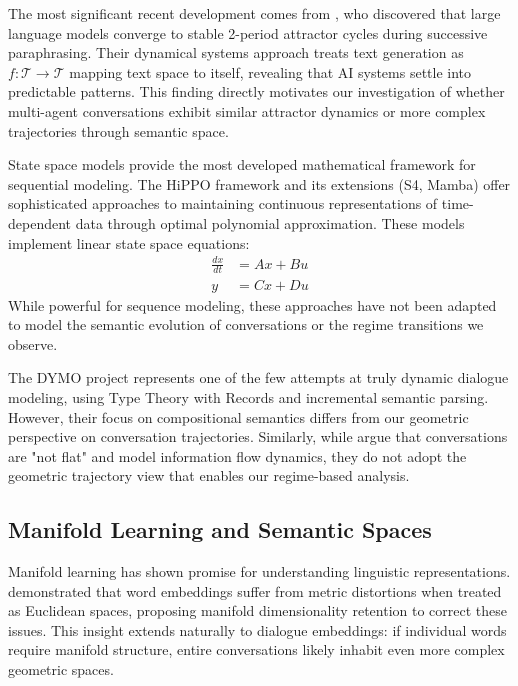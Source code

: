 \documentclass[11pt,letterpaper]{article}
\begin{document}
The most significant recent development comes from \citep{wang2025attractor}, who discovered that large language models converge to stable 2-period attractor cycles during successive paraphrasing. Their dynamical systems approach treats text generation as $f: \mathcal{T} \rightarrow \mathcal{T}$ mapping text space to itself, revealing that AI systems settle into predictable patterns. This finding directly motivates our investigation of whether multi-agent conversations exhibit similar attractor dynamics or more complex trajectories through semantic space.

State space models provide the most developed mathematical framework for sequential modeling. The HiPPO framework \citep{gu2020hippo} and its extensions (S4, Mamba) offer sophisticated approaches to maintaining continuous representations of time-dependent data through optimal polynomial approximation. These models implement linear state space equations:
\begin{align}
\frac{dx}{dt} &= Ax + Bu \\
y &= Cx + Du
\end{align}
While powerful for sequence modeling, these approaches have not been adapted to model the semantic evolution of conversations or the regime transitions we observe.

The DYMO project \citep{eshghi2017dymo} represents one of the few attempts at truly dynamic dialogue modeling, using Type Theory with Records and incremental semantic parsing. However, their focus on compositional semantics differs from our geometric perspective on conversation trajectories. Similarly, while \citep{chen2021conversations} argue that conversations are "not flat" and model information flow dynamics, they do not adopt the geometric trajectory view that enables our regime-based analysis.

\subsection{Manifold Learning and Semantic Spaces}

Manifold learning has shown promise for understanding linguistic representations. \citep{hasan2017manifold} demonstrated that word embeddings suffer from metric distortions when treated as Euclidean spaces, proposing manifold dimensionality retention to correct these issues. This insight extends naturally to dialogue embeddings: if individual words require manifold structure, entire conversations likely inhabit even more complex geometric spaces.
\end{document}
